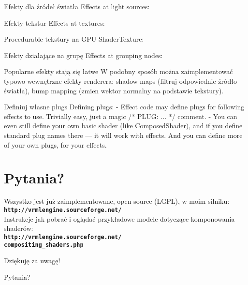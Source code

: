 \documentclass{beamer}
\begin{document}
\begin{frame}{Efekty dla źródeł światła}
  Effects at light sources:
\end{frame}

\begin{frame}{Efekty tekstur}
  Effects at textures:
\end{frame}

\begin{frame}{Procedurable tekstury na GPU}
  ShaderTexture:
\end{frame}

\begin{frame}{Efekty działające na grupę}
  Effects at grouping nodes:
\end{frame}

\begin{frame}{Popularne efekty stają się łatwe}
W podobny sposób można zaimplementować typowo wewnętrzne efekty
renderera: shadow maps (filtruj odpowiednie źródło światła),
bump mapping (zmien wektor normalny na podstawie tekstury).
\end{frame}

\begin{frame}{Definiuj własne plugs}
  Defining plugs:
  - Effect code may define plugs for following effects to use.
    Trivially easy, just a magic /* PLUG: ... */ comment.
  - You can even still define your own basic shader (like ComposedShader),
    and if you define standard plug names there --- it will work
    with effects. And you can define more of your own plugs,
    for your effects.
\end{frame}

\section{Pytania?}

\begin{frame}[t]

\begin{center}
{\small
Wszystko jest już zaimplementowane, open-source (LGPL), w moim silniku:\\
{\color{blue} \textbf{\texttt{http://vrmlengine.sourceforge.net/}}}\\
Instrukcje jak pobrać i oglądać przykładowe modele dotyczące komponowania
shaderów:\\
{\color{blue} \textbf{\texttt{http://vrmlengine.sourceforge.net/\\
compositing\_shaders.php}}}}
\end{center}

\vspace{0.25in}

\begin{center}
{\Large Dziękuję za uwagę!}
\end{center}


\begin{center}
{\Huge \alert{Pytania?}}
\end{center}

\end{frame}
\end{document}
